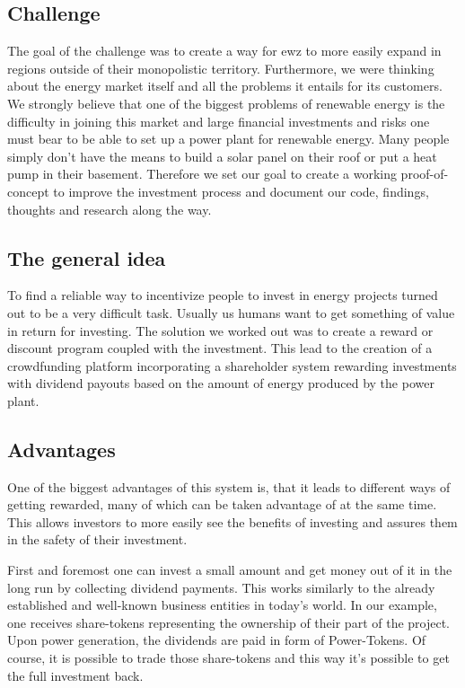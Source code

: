 \subsection{Challenge}
The goal of the challenge was to create a way for ewz to more easily expand in regions outside of their monopolistic territory. Furthermore, we were thinking about the energy market itself and all the problems it entails for its customers. We strongly believe that one of the biggest problems of renewable energy is the difficulty in joining this market and large financial investments and risks one must bear to be able to set up a power plant for renewable energy. Many people simply don't have the means to build a solar panel on their roof or put a heat pump in their basement. Therefore we set our goal to create a working proof-of-concept to improve the investment process and document our code, findings, thoughts and research along the way.

\subsection{The general idea}
To find a reliable way to incentivize people to invest in energy projects turned out to be a very difficult task. Usually us humans want to get something of value in return for investing. The solution we worked out was to create a reward or discount program coupled with the investment. This lead to the creation of a crowdfunding platform incorporating a shareholder system rewarding investments with dividend payouts based on the amount of energy produced by the power plant.

\subsection{Advantages}
One of the biggest advantages of this system is, that it leads to different ways of getting rewarded, many of which can be taken advantage of at the same time. This allows investors to more easily see the benefits of investing and assures them in the safety of their investment.

First and foremost one can invest a small amount and get money out of it in the long run by collecting dividend payments. This works similarly to the already established and well-known business entities in today's world. In our example, one receives share-tokens representing the ownership of their part of the project. Upon power generation, the dividends are paid in form of Power-Tokens. Of course, it is possible to trade those share-tokens and this way it's possible to get the full investment back.

